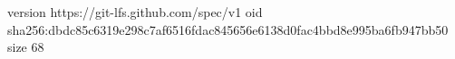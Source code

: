 version https://git-lfs.github.com/spec/v1
oid sha256:dbdc85c6319e298c7af6516fdac845656e6138d0fac4bbd8e995ba6fb947bb50
size 68
